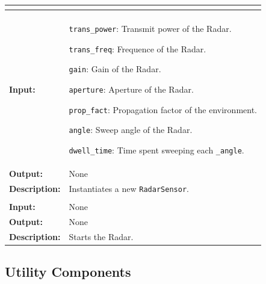 \documentclass[titlepage]{article}
\renewenvironment{itemize*}
    {\begin{itemize}
        \setlength{\itemsep}{0pt}%
        \setlength{\parskip}{0pt}%
        \setlength{\partopsep}{0pt}%
        \setlength{\topsep}{0pt}}%
    {\end{itemize}}
\newcommand{\operations}[1]{
\begin{center}
    \begin{longtable}{|p{4cm}|p{10cm + 2.0\tabcolsep}|}
    \hline
    \multicolumn{2}{|l|}{\cellcolor[gray]{0.5}{\textbf{Operations}}} \\ \hline
#1
    \end{longtable}
\end{center}
}
\newcommand{\operation}[4]{
    \hline
    \multicolumn{2}{|l|}{\cellcolor[gray]{0.8}{\texttt{#1}}} \\ \hline
    \hspace{7pt}\textbf{Input:} & #2 \\ \hline
    \hspace{7pt}\textbf{Output:} & #3 \\ \hline
    \hspace{7pt}\textbf{Description:} & #4 \\ \hline
}
\begin{document}
\operations
{
    \operation{\_\_init\_\_(trans\_power, trans\_freq, gain, aperature, prop\_fact, dwell\_time, angle)}{
        \begin{itemize*}
            \item \texttt{trans\_power}: Transmit power of the Radar.
            \item \texttt{trans\_freq}: Frequence of the Radar.
            \item \texttt{gain}: Gain of the Radar.
            \item \texttt{aperture}: Aperture of the Radar.
            \item \texttt{prop\_fact}: Propagation factor of the environment.
            \item \texttt{angle}: Sweep angle of the Radar.
            \item \texttt{dwell\_time}: Time spent sweeping each \texttt{\_angle}.
        \end{itemize*}}{None}{Instantiates a new \texttt{RadarSensor}.}
    \operation{run()}{None}{None}{Starts the Radar.}
}

\subsection{Utility Components}
\end{document}
